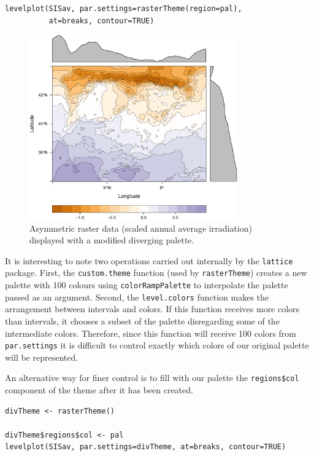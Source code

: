 \lstset{language=R}
\begin{lstlisting}
levelplot(SISav, par.settings=rasterTheme(region=pal),
          at=breaks, contour=TRUE)
\end{lstlisting}

\begin{figure}[h!]
\centering
\includegraphics[width=0.8\textwidth]{figs/divPalSISav.pdf}
\caption{\label{fig:divPalSISav}Asymmetric raster data (scaled annual average irradiation) displayed with a modified diverging palette.}
\end{figure}


It is interesting to note two operations carried out internally by
the \texttt{lattice} package. First, the \texttt{custom.theme} function (used by
\texttt{rasterTheme}) creates a new palette with 100 colours using
\texttt{colorRampPalette} to interpolate the palette passed as an
argument. Second, the \texttt{level.colors} function makes the
arrangement between intervals and colors. If this function
receives more colors than intervals, it chooses a subset of the
palette disregarding some of the intermediate colors. Therefore,
since this function will receive 100 colors from \texttt{par.settings} it
is difficult to control exactly which colors of our original
palette will be represented.

An alternative way for finer control is to fill with our palette
the \texttt{regions\$col} component of the theme after it has been
created.


\lstset{language=R}
\begin{lstlisting}
divTheme <- rasterTheme()

divTheme$regions$col <- pal
levelplot(SISav, par.settings=divTheme, at=breaks, contour=TRUE)
\end{lstlisting}

